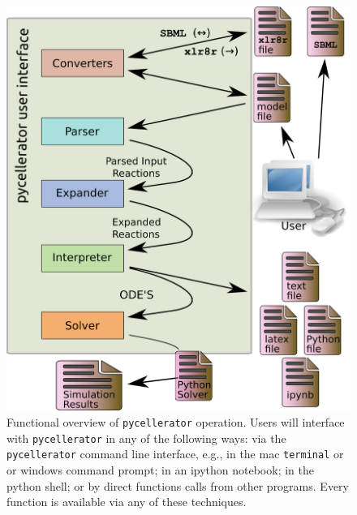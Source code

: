 \begin{figure}[ht]
\caption{Functional overview of {\tt pycellerator} operation. Users will interface with
{\tt pycellerator} in any of the following ways: via the {\tt pycellerator} command line interface, e.g., in the mac {\tt terminal} or or windows command prompt; in an ipython notebook; in the python shell; or by direct functions calls from other programs. 
 Every function is available via any of these techniques.  }\label{fig:scheme}
\begin{center}
\includegraphics[width=.75\textwidth]{pyxlr8r-scheme.png}
\end{center}
\end{figure}

